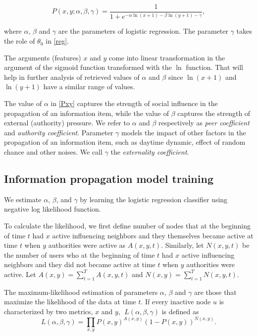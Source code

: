 \documentclass[times, utf8, zavrsni]{fer}
\begin{document}
\begin{equation}
\label{Pxy}
 P(x, y; \alpha, \beta, \gamma) = \frac{1}{1 + e ^ {-\alpha \ln(x + 1) - \beta \ln(y + 1) - \gamma}},	
\end{equation}

where $\alpha$, $\beta$ and $\gamma$ are the parameters of logistic regression. The parameter $\gamma$ takes the role of $\theta_0$ in \eqref{reg}.

The arguments (features) $x$ and $y$ come into linear transformation in the argument of the sigmoid function transformed with the $\ln$ function.  That will help in further analysis of retrieved  values of $\alpha$ and $\beta$ since $\ln(x+1)$ and $\ln(y + 1)$ have a similar range of values.  

The value of $\alpha$ in \eqref{Pxy} captures the strength of social influence in the propagation of an information item, while the value of $\beta$ captures the strength of external (authority) pressure. We refer to $\alpha$ and $\beta$ respectively as \emph{peer coefficient} and \emph{authority coefficient}. Parameter $\gamma$ models the impact of other factors in the propagation of an information item, such as daytime dynamic, effect of random chance and other noises. We call $\gamma$ the \emph{externality coefficient}. 

\subsection{Information propagation model training}
We estimate $\alpha$, $\beta$, and $\gamma$ by learning the logistic regression classifier using negative log likelihood function. 

To calculate the likelihood, we first define number of nodes that at the beginning of time $t$ had $x$ active influencing neighbors and they themselves became active at time $t$ when $y$ authorities were active as $A(x, y, t)$. Similarly, let $N(x, y, t)$ be the number of users who at the beginning of time $t$ had $x$ active influencing neighbors and they did not became active at time $t$ when $y$ authorities were active. Let $A(x, y) = \sum_{t = 1}^{T}A(x, y, t)$ and $N(x, y) = \sum_{t=1}^{T}N(x, y, t)$. 

The maximum-likelihood estimation of parameters $\alpha$, $\beta$ and $\gamma$ are those that maximize the likelihood of the data at time $t$. If every inactive node $u$ is  characterized by two metrics, $x$ and $y$,  $\; L(\alpha, \beta, \gamma)$ is defined as
\begin{equation}
\label{LF}
 L(\alpha, \beta, \gamma) = \prod_{x, y} P(x, y) ^ {A(x, y)} (1 - P(x, y)) ^ { N(x, y)}.
\end{equation}
\end{document}
